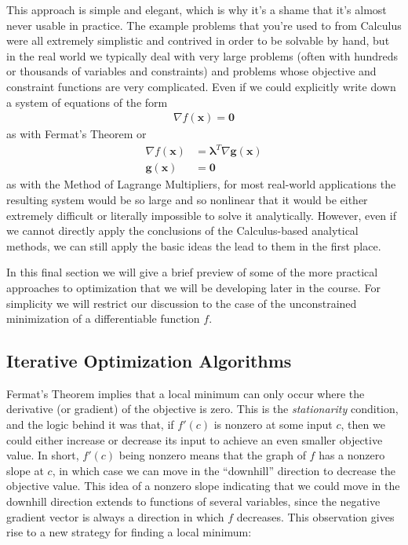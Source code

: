 \documentclass[11pt]{article}
\theoremstyle{definition} %
\begin{document}
This approach is simple and elegant, which is why it's a shame that it's almost never usable in practice. The example problems that you're used to from Calculus were all extremely simplistic and contrived in order to be solvable by hand, but in the real world we typically deal with very large problems (often with hundreds or thousands of variables and constraints) and problems whose objective and constraint functions are very complicated. Even if we could explicitly write down a system of equations of the form
\begin{align*}
	\nabla f(\mathbf{x}) = \mathbf{0}
\end{align*}
as with Fermat's Theorem or
\begin{align*}
	\nabla f(\mathbf{x}) &= \boldsymbol{\lambda}^T \nabla \mathbf{g}(\mathbf{x}) \\
	\mathbf{g}(\mathbf{x}) &= \mathbf{0}
\end{align*}
as with the Method of Lagrange Multipliers, for most real-world applications the resulting system would be so large and so nonlinear that it would be either extremely difficult or literally impossible to solve it analytically. However, even if we cannot directly apply the conclusions of the Calculus-based analytical methods, we can still apply the basic ideas the lead to them in the first place.

In this final section we will give a brief preview of some of the more practical approaches to optimization that we will be developing later in the course. For simplicity we will restrict our discussion to the case of the unconstrained minimization of a differentiable function $f$.

\subsection{Iterative Optimization Algorithms}
\label{subsec:iterative}

Fermat's Theorem implies that a local minimum can only occur where the derivative (or gradient) of the objective is zero. This is the \textit{stationarity} condition, and the logic behind it was that, if $f'(c)$ is nonzero at some input $c$, then we could either increase or decrease its input to achieve an even smaller objective value. In short, $f'(c)$ being nonzero means that the graph of $f$ has a nonzero slope at $c$, in which case we can move in the ``downhill'' direction to decrease the objective value. This idea of a nonzero slope indicating that we could move in the downhill direction extends to functions of several variables, since the negative gradient vector is always a direction in which $f$ decreases. This observation gives rise to a new strategy for finding a local minimum:
\end{document}
